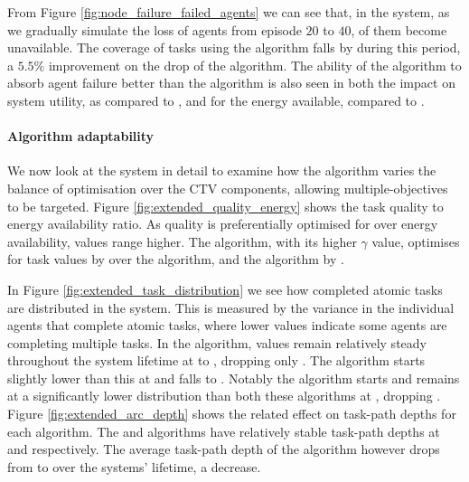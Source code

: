 From Figure \ref{fig:node_failure_failed_agents} we can see that, in the \simulationNodeFailure{}{} system, as we gradually simulate the loss of agents from episode $20$ to $40$,  \resultsNodeFailureFailedAgentsBalancedDiff{}{} of them become unavailable. The coverage  of tasks using the \algorithmBalanced{}{} algorithm falls by \resultsNodeFailureCoverageBalancedDiff{}{} during this period, a $5.5\%$ improvement on  the \resultsNodeFailureCoverageQRoutingDiff{}{} drop of the \algorithmBaseline{}{} algorithm. The ability of the \algorithmBalanced{}{} algorithm to absorb agent failure better than the \algorithmBaseline{}{} algorithm is also seen in both the impact on system utility, \resultsNodeFailureCTVBalancedImpactDiff{}{} as compared to \resultsNodeFailureCTVQRoutingImpactDiff{}{}, and for the energy available, \resultsNodeFailureCTVBalancedImpactDiff{}{} compared to \resultsNodeFailureCTVQRoutingImpactDiff{}{}.


\paragraph{Algorithm adaptability}

We now look at the \simulationExtended{}{} system in detail to examine how the algorithm varies the balance  of optimisation over the CTV components, allowing multiple-objectives to be targeted. Figure 	\ref{fig:extended_quality_energy} shows the task quality to energy availability ratio. 
As quality is preferentially optimised for over energy availability, values range higher. The \algorithmQuality{}{} algorithm, with its higher $\gamma$ value, optimises for task values by \resultsQEQualityEnd{}{} over the \algorithmEnergy{}{} algorithm, and the \algorithmDistribution{}{} algorithm by \resultsQEDistDiff{}{}. 

In Figure \ref{fig:extended_task_distribution} we see how completed atomic tasks are distributed in the system. This is measured by the variance in the individual agents that complete atomic tasks, where lower values indicate some agents are completing multiple tasks. In the \algorithmDistribution{}{} algorithm, values remain relatively steady throughout the system lifetime at \resultsTaskDistDistStart{}{} to \resultsTaskDistDistEnd{}{}, dropping only \resultsTaskDistDistPercent{}{}. The \algorithmQuality{}{} algorithm starts slightly lower than this at \resultsTaskDistQualityStart{}{} and falls \resultsTaskDistQualityPercent{}{} to \resultsTaskDistQualityEnd{}{}. Notably the \algorithmEnergy{}{} algorithm starts and remains at a significantly lower distribution than both these algorithms at \resultsTaskDistEnergyEnd{}{}, dropping \resultsTaskDistEnergydPercent{}{}. Figure
\ref{fig:extended_arc_depth} shows the related effect on task-path depths for each algorithm. The \algorithmQuality{}{} and \algorithmDistribution{}{} algorithms have relatively stable task-path depths at \resultsArcDepthQualityEnd{}{} and \resultsArcDepthDistEnd{}{} respectively. The average task-path depth of the \algorithmEnergy{}{} algorithm however drops from \resultsArcDepthEnergyStart{}{} to  \resultsArcDepthEnergyEnd{}{} over the systems' lifetime, a \resultsArcDepthEnergyPercent{}{} decrease.

